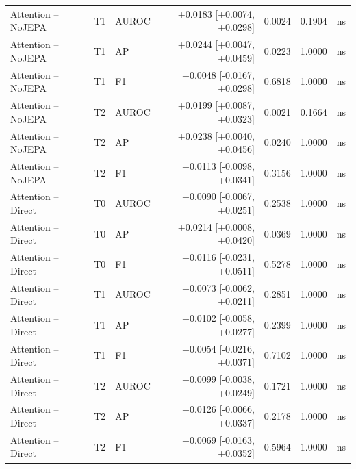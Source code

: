 \begin{table}[t]
\begin{tabular}{lllrrrc}
Attention -- NoJEPA & T1 & AUROC & +0.0183 [+0.0074, +0.0298] & 0.0024 & 0.1904 & ns \\
Attention -- NoJEPA & T1 & AP & +0.0244 [+0.0047, +0.0459] & 0.0223 & 1.0000 & ns \\
Attention -- NoJEPA & T1 & F1 & +0.0048 [-0.0167, +0.0298] & 0.6818 & 1.0000 & ns \\
Attention -- NoJEPA & T2 & AUROC & +0.0199 [+0.0087, +0.0323] & 0.0021 & 0.1664 & ns \\
Attention -- NoJEPA & T2 & AP & +0.0238 [+0.0040, +0.0456] & 0.0240 & 1.0000 & ns \\
Attention -- NoJEPA & T2 & F1 & +0.0113 [-0.0098, +0.0341] & 0.3156 & 1.0000 & ns \\
Attention -- Direct & T0 & AUROC & +0.0090 [-0.0067, +0.0251] & 0.2538 & 1.0000 & ns \\
Attention -- Direct & T0 & AP & +0.0214 [+0.0008, +0.0420] & 0.0369 & 1.0000 & ns \\
Attention -- Direct & T0 & F1 & +0.0116 [-0.0231, +0.0511] & 0.5278 & 1.0000 & ns \\
Attention -- Direct & T1 & AUROC & +0.0073 [-0.0062, +0.0211] & 0.2851 & 1.0000 & ns \\
Attention -- Direct & T1 & AP & +0.0102 [-0.0058, +0.0277] & 0.2399 & 1.0000 & ns \\
Attention -- Direct & T1 & F1 & +0.0054 [-0.0216, +0.0371] & 0.7102 & 1.0000 & ns \\
Attention -- Direct & T2 & AUROC & +0.0099 [-0.0038, +0.0249] & 0.1721 & 1.0000 & ns \\
Attention -- Direct & T2 & AP & +0.0126 [-0.0066, +0.0337] & 0.2178 & 1.0000 & ns \\
Attention -- Direct & T2 & F1 & +0.0069 [-0.0163, +0.0352] & 0.5964 & 1.0000 & ns \\
\bottomrule
\end{tabular}
\end{table}
